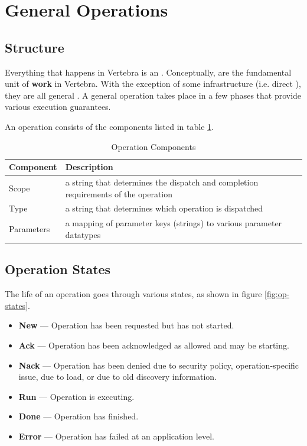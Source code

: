 \section{General Operations}


\subsection{Structure}

Everything that happens in Vertebra is an \operation{}.  Conceptually, \operations{} are the fundamental unit of \textbf{work} in Vertebra.  With the exception of some infrastructure (i.e. direct \operations{}), they are all general \operations{}.  A general operation takes place in a few phases that provide various execution guarantees.

An operation consists of the components listed in table \ref{tbl:op-parts}.

\begin{table}
	\begin{center}
		\begin{tabular}{|p{}|p{}|}
			\hline \textbf{Component} & \textbf{Description} \\
			\hline
			\hline Scope      & a string that determines the dispatch and completion requirements of the operation \\
			\hline Type       & a string that determines which operation is dispatched \\
			\hline Parameters & a mapping of parameter keys (strings) to various parameter datatypes \\
			\hline
		\end{tabular}
	\end{center}
	\caption{Operation Components}
	\label{tbl:op-parts}
\end{table}

\subsection{Operation States}

The life of an operation goes through various states, as shown in figure \ref{fig:op-states}.

\begin{itemize}
	\item \textbf{New} --- Operation has been requested but has not started.
	\item \textbf{Ack} --- Operation has been acknowledged as allowed and may be starting.
	\item \textbf{Nack} --- Operation has been denied due to security policy, operation-specific issue, due to load, or due to old discovery information.
	\item \textbf{Run} --- Operation is executing.
	\item \textbf{Done} --- Operation has finished.
	\item \textbf{Error} --- Operation has failed at an application level.
\end{itemize}

